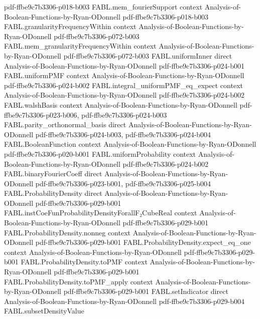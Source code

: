 \begin{theorem}
  {pdf-ffbe9c7b3306-p018-b003}
\proofstep
  {FABL.mem_fourierSupport}
  {context}
  {Analysis-of-Boolean-Functions-by-Ryan-ODonnell}
  {pdf-ffbe9c7b3306-p018-b003}
\proofstep
  {FABL.granularityFrequencyWithin}
  {context}
  {Analysis-of-Boolean-Functions-by-Ryan-ODonnell}
  {pdf-ffbe9c7b3306-p072-b003}
\proofstep
  {FABL.mem_granularityFrequencyWithin}
  {context}
  {Analysis-of-Boolean-Functions-by-Ryan-ODonnell}
  {pdf-ffbe9c7b3306-p072-b003}
\proofstep
  {FABL.uniformInner}
  {direct}
  {Analysis-of-Boolean-Functions-by-Ryan-ODonnell}
  {pdf-ffbe9c7b3306-p024-b001}
\proofstep
  {FABL.uniformPMF}
  {context}
  {Analysis-of-Boolean-Functions-by-Ryan-ODonnell}
  {pdf-ffbe9c7b3306-p024-b002}
\proofstep
  {FABL.integral_uniformPMF_eq_expect}
  {context}
  {Analysis-of-Boolean-Functions-by-Ryan-ODonnell}
  {pdf-ffbe9c7b3306-p024-b002}
\proofstep
  {FABL.walshBasis}
  {context}
  {Analysis-of-Boolean-Functions-by-Ryan-ODonnell}
  {pdf-ffbe9c7b3306-p023-b006,
    pdf-ffbe9c7b3306-p024-b003}
\proofstep
  {FABL.parity_orthonormal_basis}
  {direct}
  {Analysis-of-Boolean-Functions-by-Ryan-ODonnell}
  {pdf-ffbe9c7b3306-p024-b003,
    pdf-ffbe9c7b3306-p024-b004}
\proofstep
  {FABL.BooleanFunction}
  {context}
  {Analysis-of-Boolean-Functions-by-Ryan-ODonnell}
  {pdf-ffbe9c7b3306-p020-b001}
\proofstep
  {FABL.uniformProbability}
  {context}
  {Analysis-of-Boolean-Functions-by-Ryan-ODonnell}
  {pdf-ffbe9c7b3306-p024-b002}
\proofstep
  {FABL.binaryFourierCoeff}
  {direct}
  {Analysis-of-Boolean-Functions-by-Ryan-ODonnell}
  {pdf-ffbe9c7b3306-p023-b001,
    pdf-ffbe9c7b3306-p025-b004}
\proofstep
  {FABL.ProbabilityDensity}
  {direct}
  {Analysis-of-Boolean-Functions-by-Ryan-ODonnell}
  {pdf-ffbe9c7b3306-p029-b001}
\proofstep
  {FABL.instCoeFunProbabilityDensityForallF₂CubeReal}
  {context}
  {Analysis-of-Boolean-Functions-by-Ryan-ODonnell}
  {pdf-ffbe9c7b3306-p029-b001}
\proofstep
  {FABL.ProbabilityDensity.nonneg}
  {context}
  {Analysis-of-Boolean-Functions-by-Ryan-ODonnell}
  {pdf-ffbe9c7b3306-p029-b001}
\proofstep
  {FABL.ProbabilityDensity.expect_eq_one}
  {context}
  {Analysis-of-Boolean-Functions-by-Ryan-ODonnell}
  {pdf-ffbe9c7b3306-p029-b001}
\proofstep
  {FABL.ProbabilityDensity.toPMF}
  {context}
  {Analysis-of-Boolean-Functions-by-Ryan-ODonnell}
  {pdf-ffbe9c7b3306-p029-b001}
\proofstep
  {FABL.ProbabilityDensity.toPMF_apply}
  {context}
  {Analysis-of-Boolean-Functions-by-Ryan-ODonnell}
  {pdf-ffbe9c7b3306-p029-b001}
\proofstep
  {FABL.setIndicator}
  {direct}
  {Analysis-of-Boolean-Functions-by-Ryan-ODonnell}
  {pdf-ffbe9c7b3306-p029-b004}
\proofstep
  {FABL.subsetDensityValue}

\end{theorem}
